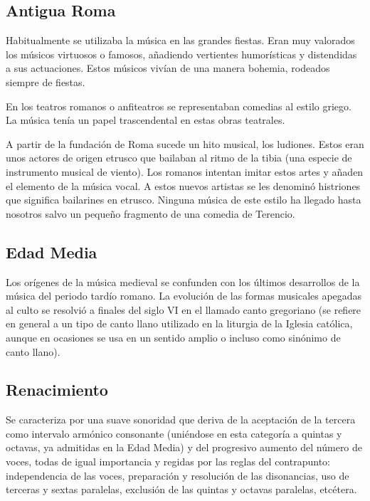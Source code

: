 \subsection{Antigua Roma}

Habitualmente se utilizaba la música en las grandes fiestas. Eran muy valorados los
músicos virtuosos o famosos, añadiendo vertientes humorísticas y distendidas a sus
actuaciones. Estos músicos vivían de una manera bohemia, rodeados siempre de fiestas.

En los teatros romanos o anfiteatros se representaban comedias al estilo griego. La música
tenía un papel trascendental en estas obras teatrales.

A partir de la fundación de Roma sucede un hito musical, los ludiones. Estos eran unos
actores de origen etrusco que bailaban al ritmo de la tibia (una especie de instrumento
musical de viento). Los romanos intentan imitar estos artes y añaden el elemento de la
música vocal. A estos nuevos artistas se les denominó histriones que significa bailarines
en etrusco. Ninguna música de este estilo ha llegado hasta nosotros salvo un pequeño
fragmento de una comedia de Terencio.


\subsection{Edad Media}

Los orígenes de la música medieval se confunden con los últimos desarrollos de la música
del periodo tardío romano. La evolución de las formas musicales apegadas al culto se
resolvió a finales del siglo VI en el llamado canto gregoriano (se refiere en general a un
tipo de canto llano utilizado en la liturgia de la Iglesia católica, aunque en ocasiones
se usa en un sentido amplio o incluso como sinónimo de canto llano).


\subsection{Renacimiento}

Se caracteriza por una suave sonoridad que deriva de la aceptación de la tercera como
intervalo armónico consonante (uniéndose en esta categoría a quintas y octavas, ya
 admitidas en la Edad Media) y del progresivo aumento del número de voces, todas de igual
 importancia y regidas por las reglas del contrapunto: independencia de las voces,
 preparación y resolución de las disonancias, uso de terceras y sextas paralelas,
 exclusión de las quintas y octavas paralelas, etcétera.

